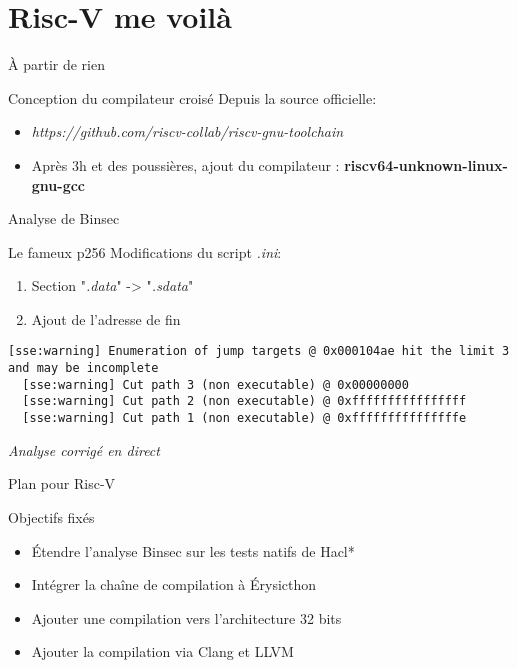 \documentclass[A4,svgnames,9pt,aspectratio=169]{beamer}
\begin{document}

\section{Risc-V me voilà}
\frame{\sectionpage}

\begin{frame}{À partir de rien}
  \begin{block}{Conception du compilateur croisé}
    Depuis la source officielle:
    \begin{itemize}
      \item \textit{https://github.com/riscv-collab/riscv-gnu-toolchain}
      \pause
      \item Après 3h et des poussières, ajout du compilateur : \textbf{riscv64-unknown-linux-gnu-gcc}
    \end{itemize}
  \end{block}
\end{frame}


\begin{frame}[fragile]{Analyse de Binsec}
  \begin{block}{Le fameux p256}
    Modifications du script \textit{.ini}:
    \begin{enumerate}
      \item Section "\textit{.data}" -> "\textit{.sdata}"
      \item Ajout de l'adresse de fin
    \end{enumerate}
  \end{block}

  \begin{lstlisting}[style=global, caption={study.ini}, gobble=2]
  [sse:warning] Enumeration of jump targets @ 0x000104ae hit the limit 3 and may be incomplete
  [sse:warning] Cut path 3 (non executable) @ 0x00000000
  [sse:warning] Cut path 2 (non executable) @ 0xffffffffffffffff
  [sse:warning] Cut path 1 (non executable) @ 0xfffffffffffffffe
  \end{lstlisting}

  \textit{Analyse corrigé en direct}

\end{frame}


\begin{frame}{Plan pour Risc-V}
  \begin{block}{Objectifs fixés}
    \begin{itemize}
      \item Étendre l'analyse Binsec sur les tests natifs de Hacl*
      \item Intégrer la chaîne de compilation à Érysicthon
      \item Ajouter une compilation vers l'architecture 32 bits
      \item Ajouter la compilation via Clang et LLVM
    \end{itemize}
  \end{block}
\end{frame}
\end{document}
